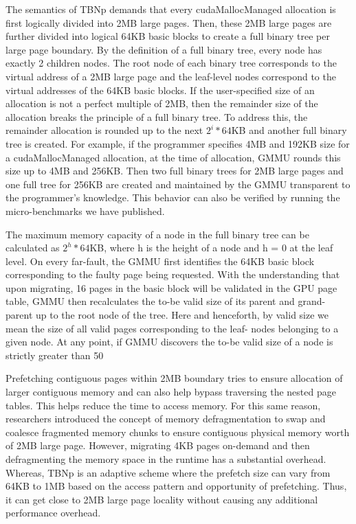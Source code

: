 The semantics of TBNp demands that every cudaMallocManaged allocation is first logically divided into 2MB large pages. Then, these 2MB large pages are further divided into logical 64KB basic blocks to create a full binary tree  per large page boundary. By the definition of a full binary tree, every node has exactly 2 children nodes. The root node of each binary tree corresponds to the virtual address of a 2MB large page and the leaf-level nodes correspond to the virtual addresses of the 64KB basic blocks. If the user-specified size of an allocation is not a perfect multiple of 2MB, then the remainder size of the allocation breaks the principle of a full binary tree. To address this, the remainder allocation is rounded up to the next $2^i * 64$KB and another full binary tree is created. For example, if the programmer specifies 4MB and 192KB size for a cudaMallocManaged allocation, at the time of allocation, GMMU rounds this size up to 4MB and 256KB. Then two full binary trees for 2MB large pages and one full tree for 256KB are created and maintained by the GMMU transparent to the programmer’s knowledge. This behavior can also be verified by running the micro-benchmarks we have published. 

The maximum memory capacity of a node in the full binary tree can be calculated as $2^h * 64$KB, where h is the height of a node and h = 0 at the leaf level. On every far-fault, the GMMU first identifies the 64KB basic block corresponding to the faulty page being requested. With the understanding that upon migrating, 16 pages in the basic block will be validated in the GPU page table, GMMU then recalculates the to-be valid size of its parent and grand- parent up to the root node of the tree. Here and henceforth, by valid size we mean the size of all valid pages corresponding to the leaf- nodes belonging to a given node. At any point, if GMMU discovers the to-be valid size of a node is strictly greater than 50%

Prefetching contiguous pages within 2MB boundary tries to ensure allocation of larger contiguous memory and can also help bypass traversing the nested page tables. This helps reduce the time to access memory. For this same reason, researchers introduced the concept of memory defragmentation to swap and coalesce fragmented memory chunks to ensure contiguous physical memory worth of 2MB large page. However, migrating 4KB pages on-demand and then defragmenting the memory space in the runtime has a substantial overhead. Whereas, TBNp is an adaptive scheme where the prefetch size can vary from 64KB to 1MB based on the access pattern and opportunity of prefetching. Thus, it can get close to 2MB large page locality without causing any additional performance overhead. 

